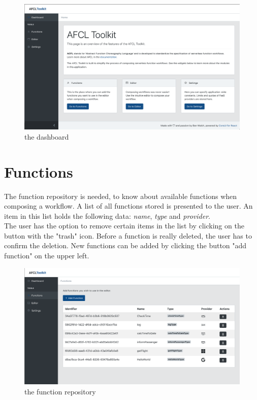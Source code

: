 \documentclass[a4paper,top=25mm,bottom=25mm,12pt,pdftex,halfparskip,twoside,bibtotoc,numbers=noenddot]{scrbook}
\begin{document}
\begin{figure}[H]
  \centering
  \includegraphics[width=\textwidth]{dashboard}
  \caption{the dashboard}
\end{figure}

\section{Functions}

The function repository is needed, to know about available functions when composing a workflow.  A list of all functions stored is presented to the user. An item in this list holds the following data: \textit{name}, \textit{type} and \textit{provider}.\\
The user has the option to remove certain items in the list by clicking on the button with the "trash" icon. Before a function is really deleted, the user has to confirm the deletion.
New functions can be added by clicking the button "add function" on the upper left.

\begin{figure}[H]
  \centering
  \includegraphics[width=\textwidth]{functions}
  \caption{the function repository}
\end{figure}
\end{document}
